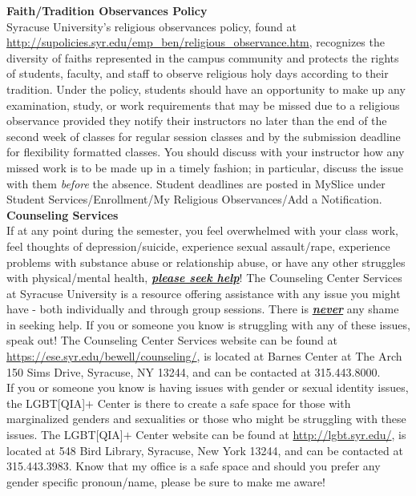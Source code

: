 \documentclass[11pt,letterpaper]{article}
\newcommand{\lefthead}[2]{\noindent\textbf{#1}\hfill\\[#2]}
\begin{document}
\lefthead{Faith/Tradition Observances Policy}{0.3cm}
\noindent Syracuse University's religious observances policy, found at \url{http://supolicies.syr.edu/emp_ben/religious_observance.htm}, recognizes the diversity of faiths represented in the campus community and protects the rights of students, faculty, and staff to observe religious holy days according to their tradition. Under the policy, students should have an opportunity to make up any examination, study, or work requirements that may be missed due to a religious observance provided they notify their instructors no later than the end of the second week of classes for regular session classes and by the submission deadline for flexibility formatted classes. You should discuss with your instructor how any missed work is to be made up in a timely fashion; in particular, discuss the issue with them \emph{before} the absence. Student deadlines are posted in MySlice under Student Services/Enrollment/My Religious Observances/Add a Notification. \\[0.3cm]





\lefthead{Counseling Services}{0.3cm}
\noindent If at any point during the semester, you feel overwhelmed with your class work, feel thoughts of depression/suicide, experience sexual assault/rape, experience problems with substance abuse or relationship abuse, or have any other struggles with physical/mental health, \emph{\textbf{\underline{please seek help}}}! The Counseling Center Services at Syracuse University is a resource offering assistance with any issue you might have - both individually and through group sessions. There is \emph{\underline{\textbf{never}}} any shame in seeking help. If you or someone you know is struggling with any of these issues, speak out! The Counseling Center Services website can be found at \url{https://ese.syr.edu/bewell/counseling/}, is located at Barnes Center at The Arch 150 Sims Drive, Syracuse, NY 13244, and can be contacted at 315.443.8000. \\

\noindent If you or someone you know is having issues with gender or sexual identity issues, the LGBT[QIA]$+$ Center is there to create a safe space for those with marginalized genders and sexualities or those who might be struggling with these issues. The LGBT[QIA]$+$ Center website can be found at \url{http://lgbt.syr.edu/}, is located at 548 Bird Library, Syracuse, New York 13244, and can be contacted at 315.443.3983. Know that my office is a safe space and should you prefer any gender specific pronoun/name, please be sure to make me aware! \\[0.3cm]
\end{document}
